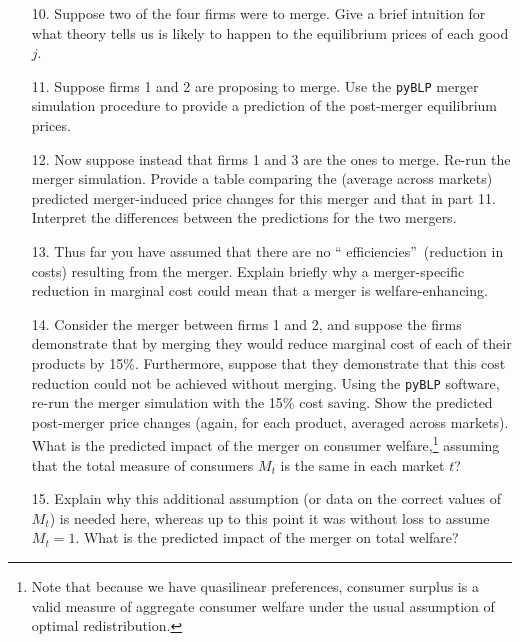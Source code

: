 \documentclass[english,11pt]{article}
\begin{document}
\begin{enumerate}
\item[10.] Suppose two of the four firms were to merge. Give a brief
intuition for what theory tells us is likely to happen to the equilibrium
prices of each good $j$.

\item[11.] Suppose firms 1 and 2 are proposing to merge. Use the \texttt{pyBLP}
merger simulation procedure to provide a prediction of the post-merger
equilibrium prices.

\item[12.] Now suppose instead that firms 1 and 3 are the ones to merge.
Re-run the merger simulation. Provide a table comparing the (average
across markets) predicted merger-induced price changes for this merger and
that in part 11. Interpret the differences between the predictions for the
two mergers.

\item[13.] Thus far you have assumed that there are no \textquotedblleft
efficiencies\textquotedblright\ (reduction in costs) resulting from the
merger. Explain briefly why a merger-specific reduction in marginal cost
could mean that a merger is welfare-enhancing.

\item[14.] Consider the merger between firms 1 and 2, and suppose the firms
demonstrate that by merging they would reduce marginal cost of each of their
products by 15\%. Furthermore, suppose that they demonstrate that this cost
reduction could not be achieved without merging.    Using the \texttt{pyBLP} software, re-run the merger simulation
with the 15\% cost saving. Show the predicted post-merger price changes (again,
for each product, averaged across markets). What is the predicted impact of
the merger on consumer welfare,\footnote{%
Note that because we have quasilinear preferences, consumer surplus is a
valid measure of aggregate consumer welfare under the usual assumption of
optimal redistribution.} assuming that the total measure of consumers $%
M_{t} $ is the same in each market  $t$?  
\item[15.] Explain why this additional assumption
(or data on the correct values of $M_{t}$) is needed here, whereas up to
this point it was without loss to assume $M_{t}=1$. What is the predicted
impact of the merger on total welfare?
\end{enumerate}
\end{document}
